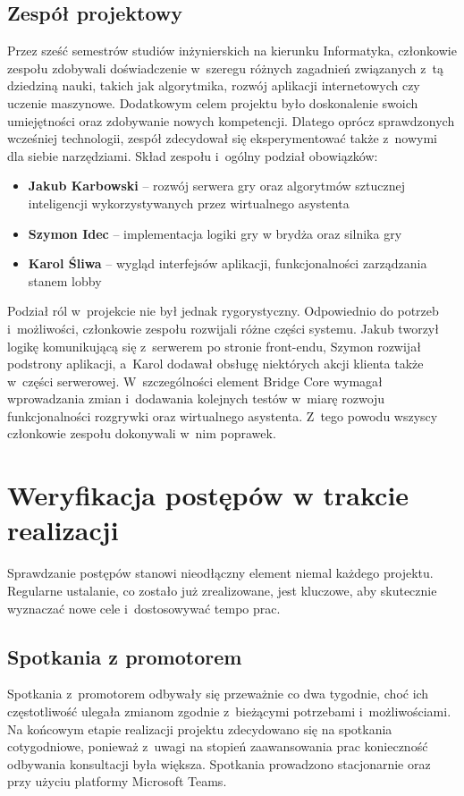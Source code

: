 \subsection{Zespół projektowy}
Przez sześć semestrów studiów inżynierskich na kierunku Informatyka, członkowie zespołu zdobywali
doświadczenie w~szeregu różnych zagadnień związanych z~tą dziedziną nauki, takich jak algorytmika,
rozwój aplikacji internetowych czy uczenie maszynowe. Dodatkowym celem projektu było doskonalenie
swoich umiejętności oraz zdobywanie nowych kompetencji. Dlatego oprócz sprawdzonych wcześniej technologii,
zespół zdecydował się eksperymentować także z~nowymi dla siebie narzędziami.
Skład zespołu i~ogólny podział obowiązków:
\begin{itemize}
    \item \textbf{Jakub Karbowski} -- rozwój serwera gry oraz algorytmów sztucznej inteligencji
          wykorzystywanych przez wirtualnego asystenta
    \item \textbf{Szymon Idec} -- implementacja logiki gry w brydża oraz silnika gry
    \item \textbf{Karol Śliwa} -- wygląd interfejsów aplikacji, funkcjonalności zarządzania stanem lobby
\end{itemize}
Podział ról w~projekcie nie był jednak rygorystyczny. Odpowiednio do potrzeb i~możliwości,
członkowie zespołu rozwijali różne części systemu. Jakub tworzył logikę komunikującą się z~serwerem po stronie
front-endu, Szymon rozwijał podstrony aplikacji, a~Karol dodawał obsługę niektórych akcji klienta także w~części
serwerowej. W~szczególności element Bridge Core wymagał wprowadzania zmian i~dodawania kolejnych testów
w~miarę rozwoju funkcjonalności rozgrywki oraz wirtualnego asystenta. Z~tego powodu wszyscy członkowie
zespołu dokonywali w~nim poprawek.


\section{Weryfikacja postępów w trakcie realizacji}

Sprawdzanie postępów stanowi nieodłączny element niemal każdego
projektu. Regularne ustalanie, co zostało już zrealizowane, jest kluczowe,
aby skutecznie wyznaczać nowe cele i~dostosowywać tempo prac.


\subsection{Spotkania z promotorem}
Spotkania z~promotorem odbywały się przeważnie co dwa tygodnie, choć ich częstotliwość
ulegała zmianom zgodnie z~bieżącymi potrzebami i~możliwościami. Na końcowym etapie realizacji projektu zdecydowano
się na spotkania cotygodniowe, ponieważ z~uwagi na stopień zaawansowania prac konieczność odbywania
konsultacji była większa. Spotkania prowadzono stacjonarnie oraz przy użyciu platformy Microsoft Teams.

